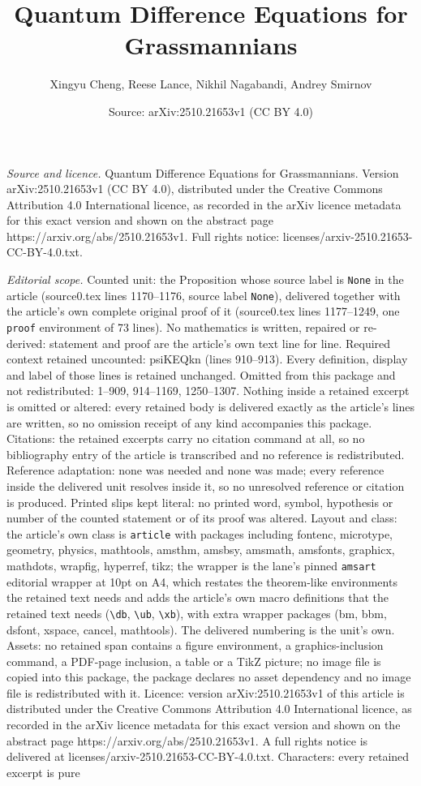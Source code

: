 \documentclass[10pt,a4paper]{amsart}
\title[Quantum Difference Equations for Grassmannians]{Quantum Difference Equations for Grassmannians}
\author{Xingyu Cheng, Reese Lance, Nikhil Nagabandi, Andrey Smirnov}
\date{Source: arXiv:2510.21653v1 (CC BY 4.0)}
\begin{document}
\maketitle

\noindent\emph{Source and licence.} Quantum Difference Equations for Grassmannians. Version arXiv:2510.21653v1 (CC BY 4.0), distributed under the Creative Commons Attribution 4.0 International licence, as recorded in the arXiv licence metadata for this exact version and shown on the abstract page https://arxiv.org/abs/2510.21653v1. Full rights notice: licenses/arxiv-2510.21653-CC-BY-4.0.txt.\par\smallskip

\noindent\textit{Editorial scope.} Counted unit: the Proposition whose source label is \texttt{None} in the article (source0.tex lines 1170--1176, source label \texttt{None}), delivered together with the article's own complete original proof of it (source0.tex lines 1177--1249, one \texttt{proof} environment of 73 lines). No mathematics is written, repaired or re-derived: statement and proof are the article's own text line for line. Required context retained uncounted: psiKEQkn (lines 910--913). Every definition, display and label of those lines is retained unchanged. Omitted from this package and not redistributed: 1--909, 914--1169, 1250--1307. Nothing inside a retained excerpt is omitted or altered: every retained body is delivered exactly as the article's lines are written, so no omission receipt of any kind accompanies this package. Citations: the retained excerpts carry no citation command at all, so no bibliography entry of the article is transcribed and no reference is redistributed. Reference adaptation: none was needed and none was made; every reference inside the delivered unit resolves inside it, so no unresolved reference or citation is produced. Printed slips kept literal: no printed word, symbol, hypothesis or number of the counted statement or of its proof was altered. Layout and class: the article's own class is \texttt{article} with packages including fontenc, microtype, geometry, physics, mathtools, amsthm, amsbsy, amsmath, amsfonts, graphicx, mathdots, wrapfig, hyperref, tikz; the wrapper is the lane's pinned \texttt{amsart} editorial wrapper at 10pt on A4, which restates the theorem-like environments the retained text needs and adds the article's own macro definitions that the retained text needs (\texttt{\textbackslash db}, \texttt{\textbackslash ub}, \texttt{\textbackslash xb}), with extra wrapper packages (bm, bbm, dsfont, xspace, cancel, mathtools). The delivered numbering is the unit's own. Assets: no retained span contains a figure environment, a graphics-inclusion command, a PDF-page inclusion, a table or a TikZ picture; no image file is copied into this package, the package declares no asset dependency and no image file is redistributed with it. Licence: version arXiv:2510.21653v1 of this article is distributed under the Creative Commons Attribution 4.0 International licence, as recorded in the arXiv licence metadata for this exact version and shown on the abstract page https://arxiv.org/abs/2510.21653v1. A full rights notice is delivered at licenses/arxiv-2510.21653-CC-BY-4.0.txt. Characters: every retained excerpt is pure 
\end{document}
